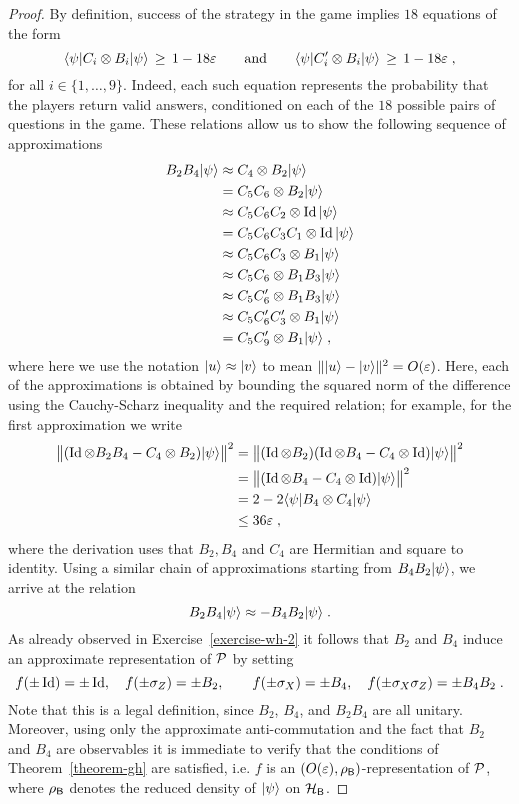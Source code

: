\begin{proof}
By definition, success of the strategy in the game implies $18$ equations of the form 
\begin{equation}
\label{equation-ms-bc-1}
 \langle\psi| C_i \otimes B_i |\psi\rangle \,\geq \, 1-18\varepsilon\qquad\text{and}\qquad \langle\psi| C'_i \otimes B_i |\psi\rangle \,\geq \, 1-18\varepsilon\;,
\end{equation}
for all $i\in \{1,\ldots,9\}$. Indeed, each such equation represents the probability that the players return valid answers, conditioned on each of the $18$ possible pairs of questions in the game. These relations allow us to show the following sequence of approximations
\begin{align*}
B_2 B_4 |\psi\rangle & \approx C_4 \otimes B_2 |\psi\rangle\\
&= C_5 C_6 \otimes B_2 |\psi\rangle\\
&\approx C_5 C_6 C_2 \otimes \mathop{\rm Id}\nolimits |\psi\rangle\\
&= C_5 C_6 C_3 C_1 \otimes \mathop{\rm Id}\nolimits |\psi\rangle\\
&\approx C_5C_6C_3 \otimes B_1 |\psi\rangle\\
&\approx C_5C_6\otimes B_1 B_3 |\psi\rangle\\
&\approx C_5C'_6\otimes B_1 B_3 |\psi\rangle\\
&\approx C_5C'_6 C'_3\otimes B_1  |\psi\rangle\\
&=  C_5C'_9\otimes B_1  |\psi\rangle\;,
\end{align*}
where here we use the notation $|u\rangle\approx |v\rangle$ to mean $\||u\rangle - |v\rangle\|^2 = O(\varepsilon)$. Here, each of the approximations is obtained by bounding the squared norm of the difference using the Cauchy-Scharz inequality and the required relation; for example, for the first approximation we write
\begin{align*}
 \big\|(\mathop{\rm Id}\nolimits \otimes B_2 B_4 - C_4 \otimes B_2)|\psi\rangle\big\|^2
&= \big\|(\mathop{\rm Id}\nolimits \otimes B_2)(\mathop{\rm Id}\nolimits\otimes B_4 - C_4 \otimes \mathop{\rm Id}\nolimits)|\psi\rangle\big\|^2\\
&= \big\|(\mathop{\rm Id}\nolimits\otimes B_4 - C_4 \otimes \mathop{\rm Id}\nolimits)|\psi\rangle\big\|^2\\ 
&= 2 - 2 \langle\psi| B_4 \otimes C_4 |\psi\rangle \\
& \leq 36\varepsilon\;,
\end{align*}
where the derivation uses that $B_2,B_4$ and $C_4$ are Hermitian and square to identity. 
Using a similar chain of approximations starting from $B_4 B_2 |\psi\rangle$, we arrive at the relation
\[B_2B_4 |\psi\rangle \approx -B_4B_2 |\psi\rangle\;.\]
As already observed in Exercise~\ref{exercise-wh-2} it follows that $B_2$ and $B_4$ induce an approximate representation of $\mathcal{P}$ by setting 
$$ f(\pm \mathop{\rm Id}\nolimits)=\pm\mathop{\rm Id}\nolimits,\quad f(\pm\sigma_Z)=\pm B_2,\quad\quad f(\pm\sigma_X)=\pm B_4,\quad f(\pm\sigma_X\sigma_Z) = \pm B_4B_2\;.$$
Note that this is a legal definition, since $B_2$, $B_4$, and $B_2B_4$ are all unitary. Moreover, using only the approximate anti-commutation and the fact that $B_2$ and $B_4$ are observables it is immediate to verify that the conditions of Theorem~\ref{theorem-gh} are satisfied, i.e. $f$ is an $(O({\varepsilon}),\rho_{\textsf{B}})$-representation of $\mathcal{P}$, where $\rho_{\textsf{B}}$ denotes the reduced density of $|\psi\rangle$ on $\mathcal{H}_{\textsf{B}}$.  


\end{proof}
